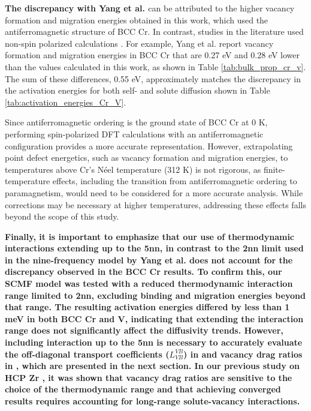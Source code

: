 \documentclass[preprint,12pt]{elsarticle}
\providecommand{\DIFaddtex}[1]{{\bf #1}} %
\providecommand{\DIFdeltex}[1]{} %
\providecommand{\DIFaddbegin}{\protect\color{blue}} %
\providecommand{\DIFaddend}{\protect\color{black}} %
\providecommand{\DIFdelbegin}{\protect\color{red}} %
\providecommand{\DIFdelend}{\protect\color{black}} %
\providecommand{\DIFadd}[1]{\texorpdfstring{\DIFaddtex{#1}}{#1}} %
\providecommand{\DIFdel}[1]{\texorpdfstring{\DIFdeltex{#1}}{}} %
\newcommand{\DIFscaledelfig}{0.5}
\newlength{\DIFdelgraphicswidth} %
\newlength{\DIFdelgraphicsheight} %
\newcommand{\DIFaddincludegraphics}[2][]{{\color{blue}\fbox{\DIFOincludegraphics[#1]{#2}}}} %
\newcommand{\DIFdelincludegraphics}[2][]{%
\sbox{\DIFdelgraphicsbox}{\DIFOincludegraphics[#1]{#2}}%
\settoboxwidth{\DIFdelgraphicswidth}{\DIFdelgraphicsbox} %
\settoboxtotalheight{\DIFdelgraphicsheight}{\DIFdelgraphicsbox} %
\scalebox{\DIFscaledelfig}{%
\parbox[b]{\DIFdelgraphicswidth}{\usebox{\DIFdelgraphicsbox}\\[-\baselineskip] \rule{\DIFdelgraphicswidth}{0em}}\llap{\resizebox{\DIFdelgraphicswidth}{\DIFdelgraphicsheight}{%
\setlength{\unitlength}{\DIFdelgraphicswidth}%
\begin{picture}(1,1)%
\thicklines\linethickness{2pt} %
{\color[rgb]{1,0,0}\put(0,0){\framebox(1,1){}}}%
{\color[rgb]{1,0,0}\put(0,0){\line( 1,1){1}}}%
{\color[rgb]{1,0,0}\put(0,1){\line(1,-1){1}}}%
\end{picture}%
}\hspace*{3pt}}} %
} %
\DeclareRobustCommand{\DIFaddbegin}{\DIFOaddbegin \let\includegraphics\DIFaddincludegraphics} %
\DeclareRobustCommand{\DIFaddend}{\DIFOaddend \let\includegraphics\DIFOincludegraphics} %
\DeclareRobustCommand{\DIFdelbegin}{\DIFOdelbegin \let\includegraphics\DIFdelincludegraphics} %
\DeclareRobustCommand{\DIFdelend}{\DIFOaddend \let\includegraphics\DIFOincludegraphics} %
\begin{document}
\DIFdelbegin \DIFdel{This discrepancy }\DIFdelend \DIFaddbegin \DIFadd{The discrepancy with Yang et al. \cite{yang_significant_2023} }\DIFaddend can be attributed to the higher vacancy formation and migration energies obtained in this work, which used the antiferromagnetic structure of BCC Cr. In contrast, studies in the literature used non-spin polarized calculations \citep{yang_significant_2023,nguyen_bcc_2006,SHANG2016128,fattahpour_understanding_2022}. For example, Yang et al. report vacancy formation and migration energies in BCC Cr that are 0.27 eV and 0.28 eV lower than the values calculated in this work, as shown in Table \ref{tab:bulk_prop_cr_v}. The sum of these differences, 0.55 eV, approximately matches the discrepancy in the activation energies for both self- and solute diffusion shown in Table \ref{tab:activation_energies_Cr_V}.

Since antiferromagnetic ordering is the ground state of BCC Cr at 0 K, performing spin-polarized DFT calculations with an antiferromagnetic configuration provides a more accurate representation. However, extrapolating point defect energetics, such as vacancy formation and migration energies, to temperatures above Cr's Néel temperature (312 K) \citep{bacon1969magnetic} is not rigorous, as finite-temperature effects, including the transition from antiferromagnetic ordering to paramagnetism, would need to be considered for a more accurate analysis. While corrections may be necessary at higher temperatures, addressing these effects falls beyond the scope of this study.

\DIFaddbegin \DIFadd{Finally, it is important to emphasize that our use of thermodynamic interactions extending up to the 5nn, in contrast to the 2nn limit used in the nine-frequency model by Yang et al. \cite{yang_significant_2023} does not account for the discrepancy observed in the BCC Cr results. To confirm this, our SCMF model was tested with a reduced thermodynamic interaction range limited to 2nn, excluding binding and migration energies beyond that range. The resulting activation energies differed by less than 1 meV in both BCC Cr and V, indicating that extending the interaction range does not significantly affect the diffusivity trends. However, including interaction up to the 5nn is necessary to accurately evaluate the off-diagonal transport coefficients ($L_{VB}^{VB}$) in \Cref{eq_cluster_exp} and vacancy drag ratios in \Cref{eq:drag}, which are presented in the next section. In our previous study on HCP Zr \cite{shousha2024first} , it was shown that vacancy drag ratios are sensitive to the choice of the thermodynamic range and that achieving converged results requires accounting for long-range solute-vacancy interactions.
}
\end{document}
